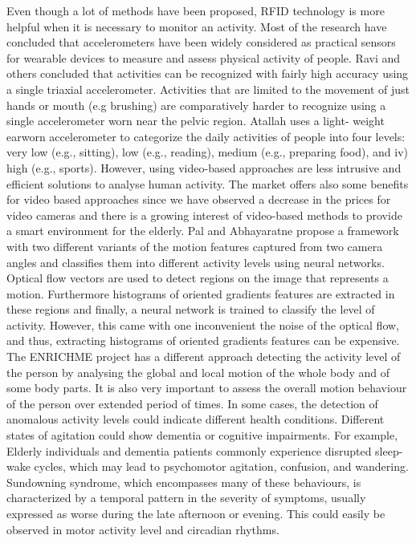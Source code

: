 Even though a lot of methods have been proposed, RFID technology is more helpful when it is necessary
to monitor an activity. Most of the research have concluded that accelerometers have been widely considered as practical sensors
for wearable devices to measure and assess physical activity of people. Ravi and others concluded that activities can be recognized with
fairly high accuracy using a single triaxial accelerometer. Activities that are limited to the movement of just hands or mouth (e.g brushing)
are comparatively harder to recognize using a single accelerometer worn near the pelvic region. \cite{ravi2005activity} Atallah uses a light- weight earworn accelerometer
to categorize the daily activities of people into four levels: very low (e.g., sitting), low (e.g., reading), medium (e.g., preparing food), and iv)
high (e.g., sports). However, using video-based approaches are less intrusive and efficient solutions to analyse human activity. The market offers
also some benefits for video based approaches since we have observed a decrease in the prices for video cameras and there is a growing interest of
video-based methods to provide a smart environment for the elderly. Pal and Abhayaratne propose a framework with two different variants of the motion
features captured from two camera angles and classifies them into different activity levels using neural networks.  \cite{pal2015video} Optical flow vectors are used to detect
regions on the image that represents a motion. Furthermore histograms of oriented gradients features are extracted in these regions and finally,
a neural network is trained to classify the level of activity. However, this came with one inconvenient the noise of the optical flow, and thus,
extracting histograms of oriented gradients features can be expensive. The ENRICHME project has a different approach detecting the activity level
of the person by analysing the global and local motion of the whole body and of some body parts. 
It is also very important to assess the overall motion behaviour of the person over extended period of times.
In some cases, the detection of anomalous activity levels could indicate different health conditions. 
Different states of agitation could show dementia or cognitive impairments. For example, Elderly individuals and dementia
patients commonly experience disrupted sleep-wake cycles, which may lead to psychomotor agitation, confusion, and wandering.
Sundowning syndrome, which encompasses many of these behaviours, is characterized by a temporal pattern in the severity of symptoms,
usually expressed as worse during the late afternoon or evening. This could easily be observed in motor activity level and circadian rhythms. \cite{bedrosian2013sundowning}  
